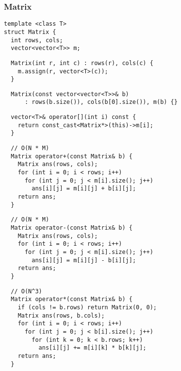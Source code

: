 \documentclass[twoside]{article}
\begin{document}
\begin{multicols*}{2}
\subsubsection*{Matrix}
\begin{verbatim}
template <class T>
struct Matrix {
  int rows, cols;
  vector<vector<T>> m;
\end{verbatim}
\vspace{-12pt}
\begin{verbatim}
  Matrix(int r, int c) : rows(r), cols(c) {
    m.assign(r, vector<T>(c));
  }
\end{verbatim}
\vspace{-12pt}
\begin{verbatim}
  Matrix(const vector<vector<T>>& b)
      : rows(b.size()), cols(b[0].size()), m(b) {}
\end{verbatim}
\vspace{-12pt}
\begin{verbatim}
  vector<T>& operator[](int i) const {
    return const_cast<Matrix*>(this)->m[i];
  }
\end{verbatim}
\vspace{-12pt}
\begin{verbatim}
  // O(N * M)
  Matrix operator+(const Matrix& b) {
    Matrix ans(rows, cols);
    for (int i = 0; i < rows; i++)
      for (int j = 0; j < m[i].size(); j++)
        ans[i][j] = m[i][j] + b[i][j];
    return ans;
  }
\end{verbatim}
\vspace{-12pt}
\begin{verbatim}
  // O(N * M)
  Matrix operator-(const Matrix& b) {
    Matrix ans(rows, cols);
    for (int i = 0; i < rows; i++)
      for (int j = 0; j < m[i].size(); j++)
        ans[i][j] = m[i][j] - b[i][j];
    return ans;
  }
\end{verbatim}
\vspace{-12pt}
\begin{verbatim}
  // O(N^3)
  Matrix operator*(const Matrix& b) {
    if (cols != b.rows) return Matrix(0, 0);
    Matrix ans(rows, b.cols);
    for (int i = 0; i < rows; i++)
      for (int j = 0; j < b[i].size(); j++)
        for (int k = 0; k < b.rows; k++)
          ans[i][j] += m[i][k] * b[k][j];
    return ans;
  }
\end{verbatim}
\vspace{-12pt}

\end{multicols*}
\end{document}

